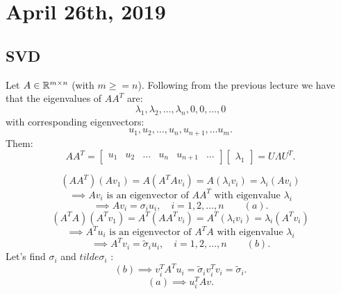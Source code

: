 \documentclass[../main/main.tex]{subfiles}
\begin{document}
\section{April 26th, 2019}
\subsection{SVD}
Let $A\in \mathbb{R}^{m\times n}$ (with $m\ge =n$).
Following from the previous lecture we have that the eigenvalues of $AA^{T}$ are: \[
\lambda_1,\lambda_2,\ldots,\lambda_n,0,0,\ldots,0
\] with corresponding eigenvectors: \[
u_1,u_2,\ldots,u_n,u_{n+1},\ldots u_{m}
.\] Them: \[
A A^{T}= \begin{bmatrix} u_1&u_2&\ldots&u_n &u_{n+1}&\ldots \end{bmatrix} \begin{bmatrix} \lambda_1 \end{bmatrix} 
=U\Lambda U^T.\] 


\[
	(A A^{T})(Av_1)=A(A^{T}Av_i)=A(\lambda_iv_i)=\lambda_i(Av_i)
\] \[
\implies Av_i \text{ is an eigenvector of $A A^{T}$ with eigenvalue $\lambda_i$}
\] \[
\implies Av_i = \sigma_i u_i, \quad i=1,2,\ldots,n \quad\quad(a)
.\]   
\[
	(A^T A)(A^Tv_1)=A^T(AA^Tv_i)=A^T(\lambda_iv_i)=\lambda_i(A^Tv_i)
\] \[
\implies A^Tu_i \text{ is an eigenvector of $A^T A$ with eigenvalue $\lambda_i$}
\] \[
\implies A^Tv_i = \tilde\sigma_i u_i, \quad i=1,2,\ldots,n \quad\quad(b)
.\]   Let's find $\sigma_i$ and $tilde \sigma_i$ :
\[
	(b) \implies v^T_i A^T u_i = \tilde\sigma_i v^T_i v_i = \tilde\sigma_i
.\] \[
(a) \implies u^T_i A v
.\] 
\end{document}

